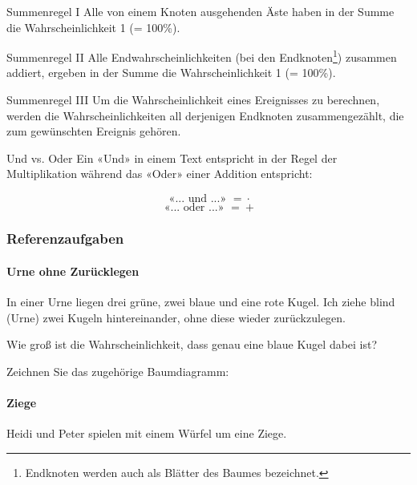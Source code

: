 \leserluft\leserluft

\begin{gesetz}{Summenregel I}{}
Alle von einem Knoten ausgehenden Äste haben in der Summe die Wahrscheinlichkeit 1 (= 100\%).
\end{gesetz}

\begin{gesetz}{Summenregel II}{}
Alle Endwahrscheinlichkeiten (bei den Endknoten\footnote{Endknoten werden auch als Blätter des Baumes bezeichnet.}) zusammen addiert, ergeben in der Summe die Wahrscheinlichkeit 1 (= 100\%).
\end{gesetz}

\begin{gesetz}{Summenregel III}{}
  Um die Wahrscheinlichkeit eines Ereignisses zu berechnen, werden die
  Wahrscheinlichkeiten all derjenigen Endknoten zusammengezählt, die zum gewünschten Ereignis gehören.
\end{gesetz}


\begin{bemerkung}{Und vs. Oder}{}
  Ein «Und» in einem Text entspricht in der Regel der Multiplikation
  während das «Oder» einer Addition entspricht:

  $$\text{ «... und ...» } \stackrel{{}^{}}{=}  \cdot{}$$
  $$\text{ «... oder ...» } \stackrel{{}^{}}{=}  +$$
\end{bemerkung}
\newpage


\subsubsection{Referenzaufgaben}

\paragraph{Urne ohne Zurücklegen} In einer Urne liegen drei grüne, zwei blaue und eine rote Kugel. Ich ziehe blind (Urne) zwei Kugeln hintereinander, ohne diese wieder zurückzulegen.

Wie groß ist die Wahrscheinlichkeit, dass genau eine blaue Kugel dabei ist?

Zeichnen Sie das zugehörige Baumdiagramm:


\paragraph{Ziege} Heidi und Peter spielen mit einem Würfel um eine Ziege.

